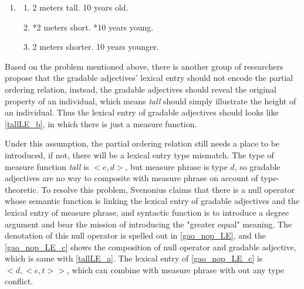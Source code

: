 \documentclass{ctexart}
\let \cite \parencite
\begin{document}
\begin{enumerate}[resume]

    \item \label{old_school_def_problem}
    
    \begin{enumerate}[ref=(\arabic{enumi}\alph*)]
        
        \item 2 meters tall. 10 years old.
        \item *2 meters short. *10 years young.
        \item \label{old_school_def_problem_correct} 2 meters shorter. 10 years younger.

    \end{enumerate}

\end{enumerate}

Based on the problem mentioned above, there is another group of researchers propose that the gradable adjectives' lexical entry should not encode the partial ordering relation, instead, the gradable adjectives should reveal the original property of an individual, which means \textit{tall} should simply illustrate the height of an individual. Thus the lexical entry of gradable adjectives should looks like \ref{tallLE_b}, in which there is just a measure function. 

Under this assumption, the partial ordering relation still needs a place to be introduced, if not, there will be a lexical entry type mismatch. The type of measure function \textit{tall} is $<e,d>$, but measure phrase is type $d$, so gradable adjectives are no way to composite with measure phrase on account of type-theoretic. To resolve this problem, Svenonius\cite{svenonius2006} claims that there is a null operator whose semantic function is linking the lexical entry of gradable adjectives and the lexical entry of measure phrase, and syntactic function is to introduce a degree argument and bear the mission of introducing the "greater equal" meaning. The denotation of this null operator is spelled out in \ref{gao_nop_LE}, and the \ref{gao_nop_LE_c} shows the composition of null operator and gradable adjective, which is same with \ref{tallLE_a}. The lexical entry of \ref{gao_nop_LE_c} is $<d,<e,t>>$, which can combine with measure phrase with out any type conflict.
\end{document}
